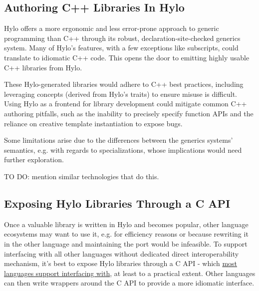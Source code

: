 \subsection{Authoring C++ Libraries In Hylo}
Hylo offers a more ergonomic and less error-prone approach to generic programming than C++ through its robust, declaration-site-checked generics system. Many of Hylo's features, with a few exceptions like subscripts, could translate to idiomatic C++ code. This opens the door to emitting highly usable C++ libraries from Hylo.

These Hylo-generated libraries would adhere to C++ best practices, including leveraging concepts (derived from Hylo's traits) to ensure misuse is difficult. Using Hylo as a frontend for library development could mitigate common C++ authoring pitfalls, such as the inability to precisely specify function APIs and the reliance on creative template instantiation to expose bugs.

Some limitations arise due to the differences between the generics systems' semantics, e.g. with regards to specializations, whose implications would need further exploration.

TO DO: mention similar technologies that do this.

\subsection{Exposing Hylo Libraries Through a C API}

Once a valuable library is written in Hylo and becomes popular, other language ecosystems may want to use it, e.g. for efficiency reasons or because rewriting it in the other language and maintaining the port would be infeasible. To support interfacing with all other languages without dedicated direct interoperability mechanism, it's best to expose Hylo libraries through a C API - which \href{https://arxiv.org/abs/2411.08388}{most languages support interfacing with}, at least to a practical extent. Other languages can then write wrappers around the C API to provide a more idiomatic interface.


